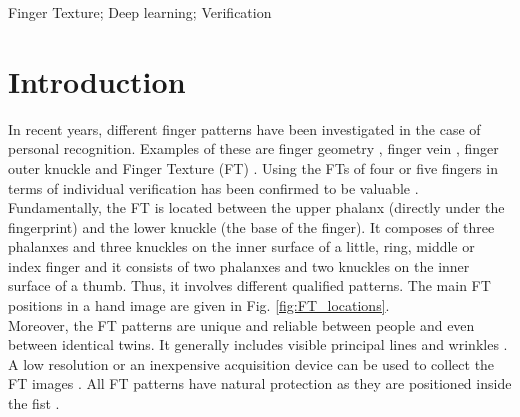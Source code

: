 \documentclass[conference]{IEEEtran}
\begin{document}
\begin{IEEEkeywords}
Finger Texture; Deep learning; Verification
\end{IEEEkeywords}

\section{Introduction}
In recent years, different finger patterns have been investigated in the case of personal recognition. Examples of these are finger geometry \cite{Liu2015Hand}, finger vein \cite{Lu2014Finger}, finger outer knuckle \cite{Kumar2014Importance} and Finger Texture (FT) \cite{Al-Nima2017finger} \cite{Al-Nima2016Robust}. Using the FTs of four or five fingers in terms of individual verification has been confirmed to be valuable \cite{Al-Nima2017efficient} \cite{Al-Nima2016ANovel} \cite{Al-Nima2015Human}. \\
Fundamentally, the FT is located between the upper phalanx (directly under the fingerprint) and the lower knuckle (the base of the finger). It composes of three phalanxes and three knuckles on the inner surface of a little, ring, middle or index finger and it consists of two phalanxes and two knuckles on the inner surface of a thumb. Thus, it involves different qualified patterns. The main FT positions in a hand image are given in Fig. \ref{fig:FT_locations}. \\
Moreover, the FT patterns are unique and reliable between people and even between identical twins. It generally includes visible principal lines and wrinkles \cite{Bhaskar2014Hand}. A low resolution or an inexpensive acquisition device can be used to collect the FT images \cite{Michael2010Robust}. All FT patterns have natural protection as they are positioned inside the fist \cite{Al-Nima2015Human}. 
\end{document}
